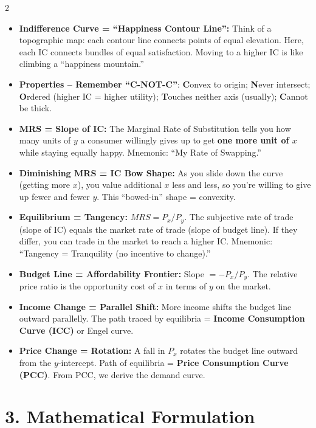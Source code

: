 \documentclass[10pt,a4paper]{article}
\begin{document}
\begin{multicols}{2}
\begin{itemize}[leftmargin=*,nosep]
    \item \textbf{Indifference Curve = ``Happiness Contour Line'':} Think of a topographic map: each contour line connects points of equal elevation. Here, each IC connects bundles of equal satisfaction. Moving to a higher IC is like climbing a ``happiness mountain.''
    \item \textbf{Properties -- Remember ``C-NOT-C''}: \textbf{C}onvex to origin; \textbf{N}ever intersect; \textbf{O}rdered (higher IC = higher utility); \textbf{T}ouches neither axis (usually); \textbf{C}annot be thick.
    \item \textbf{MRS = Slope of IC:} The Marginal Rate of Substitution tells you how many units of $y$ a consumer willingly gives up to get \textbf{one more unit of $x$} while staying equally happy. Mnemonic: ``My Rate of Swapping.''
    \item \textbf{Diminishing MRS = IC Bow Shape:} As you slide down the curve (getting more $x$), you value additional $x$ less and less, so you're willing to give up fewer and fewer $y$. This ``bowed-in'' shape = convexity.
    \item \textbf{Equilibrium = Tangency:} $MRS = P_x/P_y$. The subjective rate of trade (slope of IC) equals the market rate of trade (slope of budget line). If they differ, you can trade in the market to reach a higher IC. Mnemonic: ``Tangency = Tranquility (no incentive to change).''
    \item \textbf{Budget Line = Affordability Frontier:} Slope $= -P_x/P_y$. The relative price ratio is the opportunity cost of $x$ in terms of $y$ on the market.
    \item \textbf{Income Change = Parallel Shift:} More income shifts the budget line outward parallelly. The path traced by equilibria = \textbf{Income Consumption Curve (ICC)} or Engel curve.
    \item \textbf{Price Change = Rotation:} A fall in $P_x$ rotates the budget line outward from the $y$-intercept. Path of equilibria = \textbf{Price Consumption Curve (PCC)}. From PCC, we derive the demand curve.
\end{itemize}

\section*{3. Mathematical Formulation}


\end{multicols}
\end{document}
